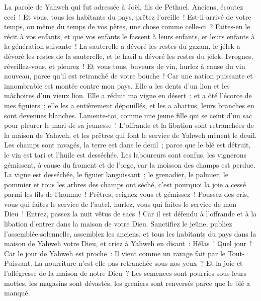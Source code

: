 \begin{multicols}{2}
\VerseOne{}La parole de Yahweh qui fut adressée à Joël, fils de Pethuel.
Anciens, écoutez ceci~! Et vous, tous les habitants du pays, prêtez l'oreille~! Est-il arrivé de votre temps, ou même du temps de vos pères, une chose comme celle-ci~?
Faites-en le récit à vos enfants, et que vos enfants le fassent à leurs enfants, et leurs enfants à la génération suivante~!
La sauterelle a dévoré les restes du gazam, le jélek a dévoré les restes de la sauterelle, et le hasil a dévoré les restes du jélek.
Ivrognes, réveillez-vous, et pleurez~! Et vous tous, buveurs de vin, hurlez à cause du vin nouveau, parce qu'il est retranché de votre bouche~!
Car une nation puissante et innombrable est montée contre mon pays. Elle a les dents d'un lion et les mâchoires d'un vieux lion.
Elle a réduit ma vigne en désert~; et a ôté l'écorce de mes figuiers~; elle les a entièrement dépouillés, et les a abattus, leurs branches en sont devenues blanches.
Lamente-toi, comme une jeune fille qui se ceint d'un sac pour pleurer le mari de sa jeunesse~!
L'offrande et la libation sont retranchées de la maison de Yahweh, et les prêtres qui font le service de Yahweh mènent le deuil.
Les champs sont ravagés, la terre est dans le deuil~; parce que le blé est détruit, le vin est tari et l'huile est desséchée.
Les laboureurs sont confus, les vignerons gémissent, à cause du froment et de l'orge, car la moisson des champs est perdue.
La vigne est desséchée, le figuier languissant~; le grenadier, le palmier, le pommier et tous les arbres des champs ont séché, c'est pourquoi la joie a cessé parmi les fils de l'homme~!
Prêtres, ceignez-vous et gémissez~! Poussez des cris, vous qui faites le service de l'autel, hurlez, vous qui faites le service de mon Dieu~! Entrez, passez la nuit vêtus de sacs~! Car il est défendu à l'offrande et à la libation d'entrer dans la maison de votre Dieu.
Sanctifiez le jeûne, publiez l'assemblée solennelle, assemblez les anciens, et tous les habitants du pays dans la maison de Yahweh votre Dieu, et criez à Yahweh en disant~:
Hélas~! Quel jour~! Car le jour de Yahweh est proche~: Il vient comme un ravage fait par le Tout-Puissant.
La nourriture n'est-elle pas retranchée sous nos yeux~? Et la joie et l'allégresse de la maison de notre Dieu~?
Les semences sont pourries sous leurs mottes, les magasins sont dévastés, les greniers sont renversés parce que le blé a manqué.

\end{multicols}
